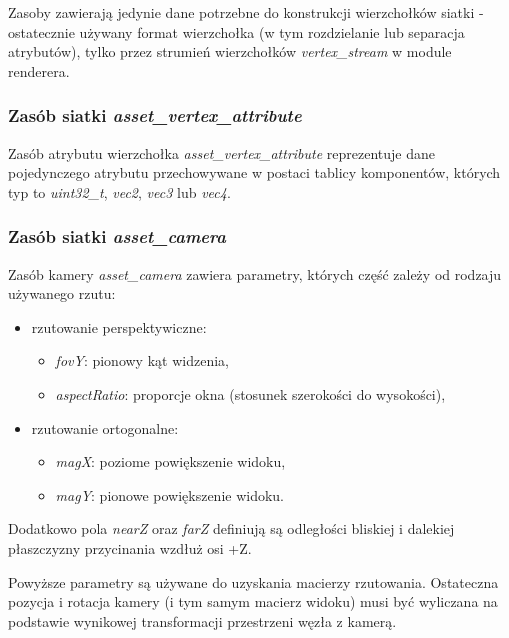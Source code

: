 Zasoby zawierają jedynie dane potrzebne do konstrukcji wierzchołków siatki - ostatecznie używany format wierzchołka (w tym rozdzielanie lub separacja atrybutów), tylko przez strumień wierzchołków \textit{vertex\_stream} w module renderera.

\subsubsection{Zasób siatki \textit{asset\_vertex\_attribute}}
Zasób atrybutu wierzchołka \textit{asset\_vertex\_attribute} reprezentuje dane pojedynczego atrybutu przechowywane w postaci tablicy komponentów, których typ to \textit{uint32\_t}, \textit{vec2}, \textit{vec3} lub \textit{vec4}.

\subsubsection{Zasób siatki \textit{asset\_camera}}
Zasób kamery \textit{asset\_camera} zawiera parametry, których część zależy od rodzaju używanego rzutu:
\begin{itemize}
	\item rzutowanie perspektywiczne:
	\begin{itemize}
		\item \textit{fovY}: pionowy kąt widzenia,
		\item \textit{aspectRatio}: proporcje okna (stosunek szerokości do wysokości),
	\end{itemize}
	\item rzutowanie ortogonalne:
		\begin{itemize}
		\item \textit{magX}: poziome powiększenie widoku,
		\item \textit{magY}: pionowe powiększenie widoku.
	\end{itemize}
\end{itemize}
Dodatkowo pola \textit{nearZ} oraz \textit{farZ} definiują są odległości bliskiej i dalekiej płaszczyzny przycinania wzdłuż osi +Z.

Powyższe parametry są używane do uzyskania macierzy rzutowania.
Ostateczna pozycja i rotacja kamery (i tym samym macierz widoku) musi być wyliczana na podstawie wynikowej transformacji przestrzeni węzła z kamerą.

